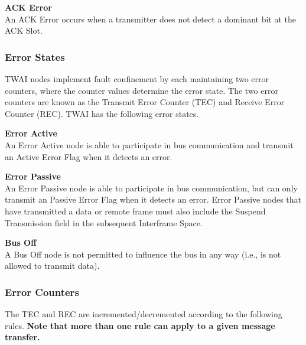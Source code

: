 \documentclass[main\_\_EN.tex]{subfiles}
\begin{document}
{\bfseries ACK Error}\\
An ACK Error occurs when a transmitter does not detect a dominant bit at the ACK Slot.

\subsubsection{Error States}

TWAI nodes implement fault confinement by each maintaining two error counters, where the counter values determine the error state. The two error counters are known as the Transmit Error Counter (TEC) and Receive Error Counter (REC). TWAI has the following error states.


{\bfseries Error Active}\\
An Error Active node is able to participate in bus communication and transmit an Active Error Flag when it detects an error.

{\bfseries Error Passive}\\
An Error Passive node is able to participate in bus communication, but can only transmit an Passive Error Flag when it detects an error. Error Passive nodes that have transmitted a data or remote frame must also include the Suspend Transmission field in the subsequent Interframe Space.

{\bfseries Bus Off}\\
A Bus Off node is not permitted to influence the bus in any way (i.e., is not allowed to transmit data).

\subsubsection{Error Counters}

The TEC and REC are incremented/decremented according to the following rules. \textbf{Note that more than one rule can apply to a given message transfer.}
\end{document}
